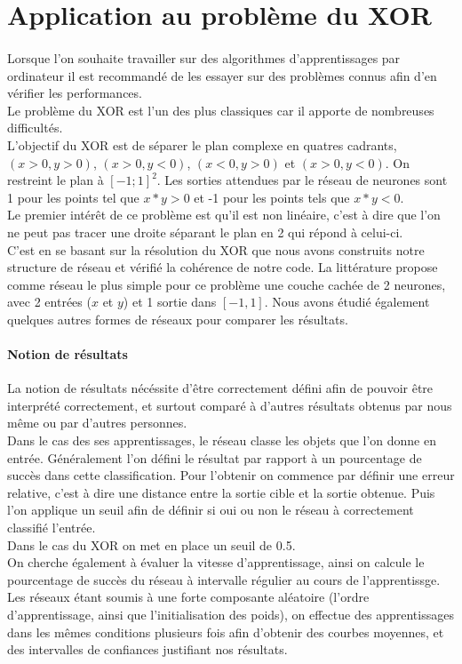 \section{Application au problème du XOR}

\paragraph*{}
Lorsque l'on souhaite travailler sur des algorithmes d'apprentissages par ordinateur il est recommandé de les essayer sur des problèmes connus afin d'en vérifier les performances. \\
Le problème du XOR est l'un des plus classiques car il apporte de nombreuses difficultés.\\

L'objectif du XOR est de séparer le plan complexe en quatres cadrants, $(x >0, y > 0)$, $ (x>0, y<0)$, $ (x<0, y>0)$ et $ (x>0, y<0) $. On restreint le plan à $[-1;1]^2$. Les sorties attendues par le réseau de neurones sont 1 pour les points tel que $x*y > 0 $ et -1 pour les points tels que $x*y<0$. \\
Le premier intérêt de ce problème est qu'il est non linéaire, c'est à dire que l'on ne peut pas tracer une droite séparant le plan en 2 qui répond à celui-ci.\\

C'est en se basant sur la résolution du XOR que nous avons construits notre structure de réseau et vérifié la cohérence de notre code. La littérature propose comme réseau le plus simple pour ce problème une couche cachée de 2 neurones, avec 2 entrées ($x$ et $y$) et 1 sortie dans $[-1, 1]$. Nous avons étudié également quelques autres formes de réseaux pour comparer les résultats.

\paragraph{Notion de résultats} %
\label{par:notion_de_resultats}
La notion de résultats nécéssite d'être correctement défini afin de pouvoir être interprété correctement, et surtout comparé à d'autres résultats obtenus par nous même ou par d'autres personnes. \\
Dans le cas des ses apprentissages, le réseau classe les objets que l'on donne en entrée. Généralement l'on défini le résultat par rapport à un pourcentage de succès dans cette classification. Pour l'obtenir on commence par définir une erreur relative, c'est à dire une distance entre la sortie cible et la sortie obtenue. Puis l'on applique un seuil afin de définir si oui ou non le réseau à correctement classifié l'entrée.\\
Dans le cas du XOR on met en place un seuil de 0.5.\\
On cherche également à évaluer la vitesse d'apprentissage, ainsi on calcule le pourcentage de succès du réseau à intervalle régulier au cours de l'apprentissge. Les réseaux étant soumis à une forte composante aléatoire (l'ordre d'apprentissage, ainsi que l'initialisation des poids), on effectue des apprentissages dans les mêmes conditions plusieurs fois afin d'obtenir des courbes moyennes, et des intervalles de confiances justifiant nos résultats.

